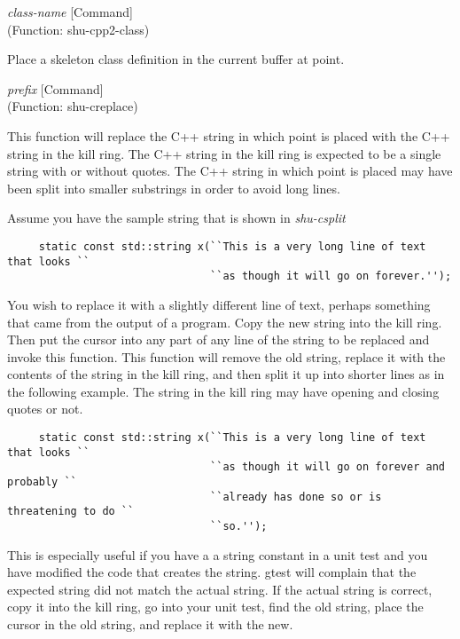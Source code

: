 \vspace{1em}
\noindent
{}
\usebox{\funcname}\emph{class-name}
 \hfill [Command]\\%
 (Function: shu-cpp2-class)

\begin{doc-string}
Place a skeleton class definition in the current buffer at point.
\end{doc-string}

\vspace{1em}
\noindent
{}
\usebox{\funcname}\emph{prefix}
 \hfill [Command]\\%
 (Function: shu-creplace)

\begin{doc-string}
This function will replace the C++ string in which point is placed with the
C++ string in the kill ring.  The C++ string in the kill ring is expected to be
a single string with or without quotes.  The C++ string in which point is placed
may have been split into smaller substrings in order to avoid long lines.

Assume you have the sample string that is shown in \emph{shu-csplit}

\small{\begin{verbatim}
     static const std::string x(``This is a very long line of text that looks ``
                                ``as though it will go on forever.'');
\end{verbatim}}

You wish to replace it with a slightly different line of text, perhaps something
that came from the output of a program.  Copy the new string into the kill ring.
Then put the cursor into any part of any line of the string to be replaced
and invoke this function.  This function will remove the old string, replace it
with the contents of the string in the kill ring, and then split it up into
shorter lines as in the following example.  The string in the kill ring may have
opening and closing quotes or not.

\small{\begin{verbatim}
     static const std::string x(``This is a very long line of text that looks ``
                                ``as though it will go on forever and probably ``
                                ``already has done so or is threatening to do ``
                                ``so.'');
\end{verbatim}}

This is especially useful if you have a a string constant in a unit test and you
have modified the code that creates the string.  gtest will complain that the
expected string did not match the actual string.  If the actual string is
correct, copy it into the kill ring, go into your unit test, find the old
string, place the cursor in the old string, and replace it with the new.
\end{doc-string}


